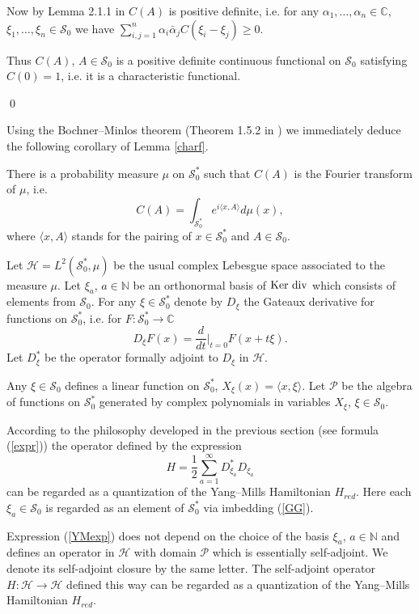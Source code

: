 \documentclass{amsart}
\begin{document}
Now by Lemma 2.1.1 in \cite{Ob} $C(A)$ is positive definite, i.e. for any $\alpha_1,\ldots, \alpha_n\in \mathbb{C}$, $\xi_1,\ldots, \xi_n\in \mathcal{S}_0$ we have $\sum_{i,j=1}^n\alpha_i\bar{\alpha}_jC(\xi_i-\xi_j)\geq 0$.

Thus $C(A)$, $A\in \mathcal{S}_0$ is a positive definite continuous functional on $\mathcal{S}_0$ satisfying $C(0)=1$, i.e. it is a characteristic functional.
 
\qed

Using the Bochner--Minlos theorem (Theorem 1.5.2 in \cite{Ob}) we immediately deduce the following corollary of Lemma \ref{charf}.
\begin{corollary}
There is a probability measure $\mu$ on $\mathcal{S}_0^*$ such that $C(A)$ is the Fourier transform of $\mu$, i.e.
$$  
C(A)=\int_{\mathcal{S}_0^*}e^{i\langle x,A\rangle }d\mu(x),
$$
where $\langle x,A\rangle $ stands for the pairing of $x\in \mathcal{S}_0^*$ and $A\in \mathcal{S}_0$.
\end{corollary}

Let $\mathcal{H}=L^2(\mathcal{S}_0^*,\mu)$ be the usual complex Lebesgue space associated to the measure $\mu$. Let $\xi_a$, $a\in \mathbb{N}$ be an orthonormal basis of ${\rm Ker~div}$ which consists of elements from $\mathcal{S}_0$. 
For any $\xi\in \mathcal{S}_0^*$ denote by $D_\xi$ the Gateaux derivative for functions on $\mathcal{S}_0^*$, i.e. for $F:\mathcal{S}_0^*\rightarrow \mathbb{C}$
$$
D_\xi F(x)=\frac{d}{dt}|_{t=0}F(x+t\xi).
$$
Let $D^*_\xi$ be the operator formally adjoint to $D_\xi$ in $\mathcal{H}$.

Any $\xi\in \mathcal{S}_0$ defines a linear function on $\mathcal{S}_0^*$, $X_\xi(x)=\langle x,\xi\rangle $. Let $\mathcal{P}$ be the algebra of functions on $\mathcal{S}_0^*$ generated by complex polynomials in variables $X_\xi$, $\xi\in \mathcal{S}_0$.

According to the philosophy developed in the previous section (see formula (\ref{expr})) the operator defined by the expression
\begin{equation}\label{YMexp}
H=\frac12\sum_{a=1}^\infty D^*_{\xi_a}D_{\xi_a}	
\end{equation}
can be regarded as a quantization of the Yang--Mills Hamiltonian $H_{red}$. Here each $\xi_a\in \mathcal{S}_0$ is regarded as an element of $\mathcal{S}_0^*$ via imbedding (\ref{GG}).

\begin{proposition}
Expression (\ref{YMexp}) does not depend on the choice of the basis $\xi_a$, $a\in \mathbb{N}$ and defines an operator in $\mathcal{H}$ with domain $\mathcal{P}$ which is essentially self-adjoint. We denote its self-adjoint closure by the same letter. The self-adjoint operator $H:\mathcal{H}\rightarrow \mathcal{H}$ defined this way can be regarded as a quantization of the Yang--Mills Hamiltonian $H_{red}$.
\end{proposition}
\end{document}
